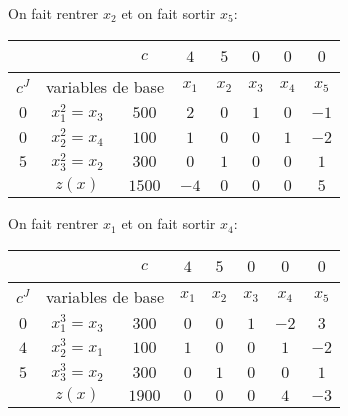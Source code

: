 {\begin{td-sol}[]
\begin{enumerate}
			On fait rentrer \(x_2\) et on fait sortir \(x_5\):
			\begin{center}
				\begin{tabular}{|ccc|ccccc|} %
					\hline  %
					\, & \, &\(c\)&\(4\)&\(5\)&\(0\)&\(0\)&\(0\)\\
					\hline %
					\multicolumn{1}{|c|}{\(c^J\)}& \multicolumn{2}{c|}{variables de base}&\(x_1\)&\(x_2\)&\(x_3\)&\(x_4\)&\(x_5\)\\
					\hline %
					\multicolumn{1}{|c|}{\(0\)}& \multicolumn{1}{c|}{\(x_1^{2}=x_3\)}&\(500\)&\(2\)&\(0\)&\(1\)&\(0\)&\(-1\)\\
					\hline %
					\multicolumn{1}{|c|}{\(0\)}& \multicolumn{1}{c|}{\(x_2^{2}=x_4\)}&\(100\)&\(1\)&\(0\)&\(0\)&\(1\)&\(-2\)\\
					\hline %
					\multicolumn{1}{|c|}{\(5\)}& \multicolumn{1}{c|}{\(x_3^{2}=x_2\)}&\(300\)&\(0\)&\(1\)&\(0\)&\(0\)&\(1\)\\
					\hline %
					\multicolumn{1}{|c|}{} &\(z(x)\)            & \multicolumn{1}{|c|}{\(1500\)}&\(-4\)&\(0\)&\(0\)&\(0\)&\(5\)\\
					\hline %
				\end{tabular}
			\end{center}

			On fait rentrer \(x_1\) et on fait sortir \(x_4\):
			\begin{center}
				\begin{tabular}{|ccc|ccccc|} %
					\hline  %
					\, & \, &\(c\)&\(4\)&\(5\)&\(0\)&\(0\)&\(0\)\\
					\hline %
					\multicolumn{1}{|c|}{\(c^J\)}& \multicolumn{2}{c|}{variables de base}&\(x_1\)&\(x_2\)&\(x_3\)&\(x_4\)&\(x_5\)\\
					\hline %
					\multicolumn{1}{|c|}{\(0\)}& \multicolumn{1}{c|}{\(x_1^{3}=x_3\)}&\(300\)&\(0\)&\(0\)&\(1\)&\(-2\)&\(3\)\\
					\hline %
					\multicolumn{1}{|c|}{\(4\)}& \multicolumn{1}{c|}{\(x_2^{3}=x_1\)}&\(100\)&\(1\)&\(0\)&\(0\)&\(1\)&\(-2\)\\
					\hline %
					\multicolumn{1}{|c|}{\(5\)}& \multicolumn{1}{c|}{\(x_3^{3}=x_2\)}&\(300\)&\(0\)&\(1\)&\(0\)&\(0\)&\(1\)\\
					\hline %
					\multicolumn{1}{|c|}{} &\(z(x)\)            & \multicolumn{1}{|c|}{\(1900\)}&\(0\)&\(0\)&\(0\)&\(4\)&\(-3\)\\
					\hline %
				\end{tabular}
			\end{center}


\end{enumerate}
\end{td-sol}}
